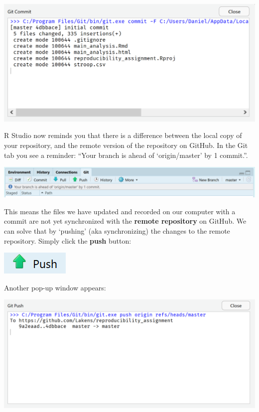 \documentclass[
  oneside]{book}
\begin{document}
\begin{center}\includegraphics[width=1\linewidth]{images/bd217abdabf5cc4e81637d8d0eb7db9e} \end{center}

R Studio now reminds you that there is a difference between the local copy of
your repository, and the remote version of the repository on GitHub. In the Git
tab you see a reminder: ``Your branch is ahead of `origin/master' by 1 commit.''.

\begin{center}\includegraphics[width=1\linewidth]{images/b3c606d72795bf88e1b7a04dbce381bb} \end{center}

This means the files we have updated and recorded on our computer with a commit
are not yet synchronized with the \textbf{remote repository} on GitHub. We can solve
that by `pushing' (aka synchronizing) the changes to the remote repository.
Simply click the \textbf{push} button:

\begin{center}\includegraphics[width=0.2\linewidth]{images/7a363782af473d6da3e79f3a088d527b} \end{center}

Another pop-up window appears:

\begin{center}\includegraphics[width=1\linewidth]{images/8b77f09c9c2cad752ec90ecdfa42e566} \end{center}
\end{document}
